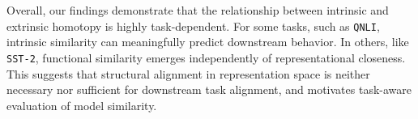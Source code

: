 Overall, our findings demonstrate that the relationship between intrinsic and extrinsic homotopy is highly task-dependent.  
For some tasks, such as \texttt{QNLI}, intrinsic similarity can meaningfully predict downstream behavior.  
In others, like \texttt{SST-2}, functional similarity emerges independently of representational closeness.  
This suggests that structural alignment in representation space is neither necessary nor sufficient for downstream task alignment, and motivates task-aware evaluation of model similarity.

